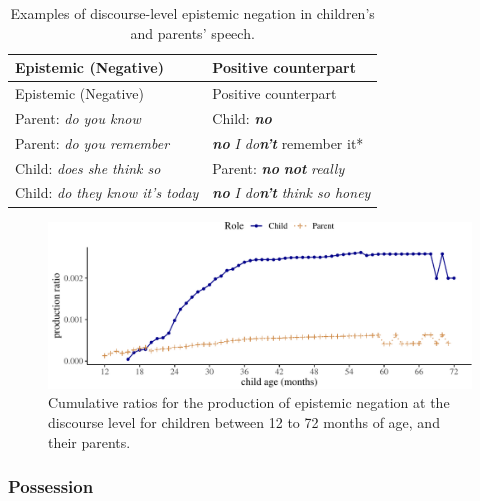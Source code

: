 \documentclass[
  english,
  man,floatsintext]{apa6}
\begin{document}
\begin{longtable}[]{@{}ll@{}}
\caption{\label{tab:epistem} Examples of discourse-level epistemic negation in children's and parents' speech.}\tabularnewline
\toprule
Epistemic (Negative) & Positive counterpart \\
\midrule
\endfirsthead
\toprule
Epistemic (Negative) & Positive counterpart \\
\midrule
\endhead
Parent: \emph{do you know} & Child: \textbf{\emph{no}} \\
Parent: \emph{do you remember} & \textbf{\emph{no}} \emph{I do}\textbf{\emph{n't}} remember it* \\
Child: \emph{does she think so} & Parent: \textbf{\emph{no}} \textbf{\emph{not}} \emph{really} \\
Child: \emph{do they know it's today} & \textbf{\emph{no}} \emph{I do}\textbf{\emph{n't}} \emph{think so honey} \\
\bottomrule
\end{longtable}

\begin{figure}[H]

{\centering \includegraphics{neg_construction_article_files/figure-latex/epistemicdiscourse-1} 

}

\caption{Cumulative ratios for the production of epistemic negation at the discourse level for children between 12 to 72 months of age, and their parents.}\label{fig:epistemicdiscourse}
\end{figure}

\hypertarget{possession}{%
\subsubsection{Possession}\label{possession}}
\end{document}
